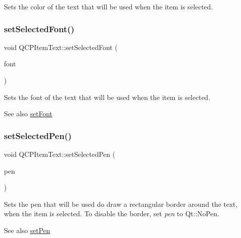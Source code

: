 Sets the color of the text that will be used when the item is selected. \mbox{\label{class_q_c_p_item_text_a0be2841772f83663c4db307928b82816}} 
\subsubsection{\texorpdfstring{set\+Selected\+Font()}{setSelectedFont()}}
{\footnotesize\ttfamily void Q\+C\+P\+Item\+Text\+::set\+Selected\+Font (\begin{DoxyParamCaption}\item[{const Q\+Font \&}]{font }\end{DoxyParamCaption})}

Sets the font of the text that will be used when the item is selected.

\begin{DoxySeeAlso}{See also}
\hyperlink{class_q_c_p_item_text_a94ad60ebe04f5c07c35e7c2029e96b1f}{set\+Font} 
\end{DoxySeeAlso}
\mbox{\label{class_q_c_p_item_text_a291febe586f0da3f1c392e77bef4aa20}} 
\subsubsection{\texorpdfstring{set\+Selected\+Pen()}{setSelectedPen()}}
{\footnotesize\ttfamily void Q\+C\+P\+Item\+Text\+::set\+Selected\+Pen (\begin{DoxyParamCaption}\item[{const Q\+Pen \&}]{pen }\end{DoxyParamCaption})}

Sets the pen that will be used do draw a rectangular border around the text, when the item is selected. To disable the border, set {\itshape pen} to Qt\+::\+No\+Pen.

\begin{DoxySeeAlso}{See also}
\hyperlink{class_q_c_p_item_text_a9b9ec6eea0eb0603977ff84d4c78d0a3}{set\+Pen} 
\end{DoxySeeAlso}
\mbox{\label{class_q_c_p_item_text_a3dacdda0ac88f99a05b333b977c48747}} 
